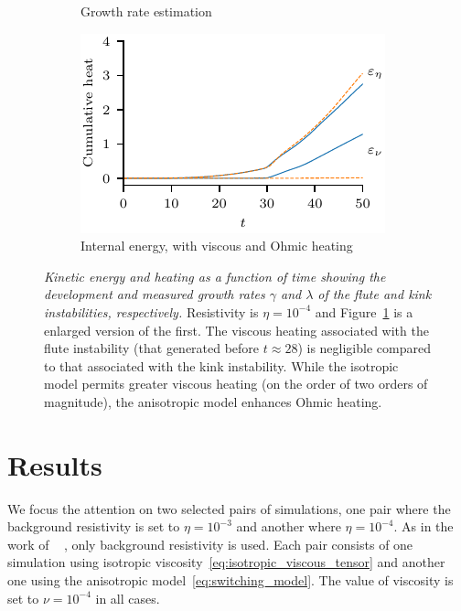 \documentclass[fleqn,usenatbib]{mnras}
\newcommand{\rev}[1]{{\color{red} {#1}}}
\newcommand{\revcite}[1]{{\color{red} \underline{#1}}}
\newcommand{\mycaption}[2]{\caption[#1]{\emph{#1} #2}}
\begin{document}
\begin{figure}
\begin{subfigure}{0.32\textwidth}
      \caption{Growth rate estimation}
      \label{fig:kink_ke_log-4}
    \end{subfigure}
    \hfill
    \begin{subfigure}{0.32\textwidth}
      \includegraphics[width=\linewidth]{heating_r-4.pdf}
      \caption{Internal energy, with viscous and Ohmic heating}
      \label{fig:heating-4}
    \end{subfigure}
  \mycaption{Kinetic energy and heating as a function of time showing the development and
  measured growth rates $\gamma$ and $\lambda$ of the flute and kink
  instabilities, respectively.}{Resistivity is $\eta=10^{-4}$ and Figure~\ref{fig:kink_ke_log-4} is a enlarged version of the first. \rev{The viscous heating associated with the flute instability (that generated before $t\approx28$) is negligible compared to that associated with the kink instability. While the isotropic model permits greater viscous heating (on the order of two orders of magnitude), the anisotropic model enhances Ohmic heating.}}
\label{fig:kink_str8_ke-4}%
\end{figure}

\section{Results}
\label{sec-results}

We focus the attention on two selected pairs of  simulations, one pair where
the background resistivity is set to $\eta=10^{-3}$ and another where
$\eta=10^{-4}$. As in the work of ~\revcite{\citet{quinnEffectAnisotropicViscosity2020}}, only
background resistivity is used. Each pair consists of one simulation using
isotropic viscosity~\eqref{eq:isotropic_viscous_tensor} and another one using
the anisotropic model~\eqref{eq:switching_model}. The value of viscosity is set
to $\nu = 10^{-4}$ in all cases. 
\end{document}
